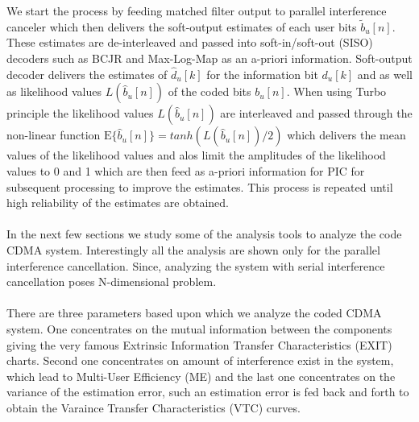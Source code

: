 We start the process by feeding matched filter output to parallel interference canceler which then delivers the soft-output estimates of each user bits $\tilde{b}_u[n]$. These estimates are de-interleaved and passed into soft-in/soft-out (SISO) decoders such as BCJR \cite{BCJR} and Max-Log-Map \cite{MLP} as an a-priori information. Soft-output decoder delivers the estimates of $\hat{d}_u[k]$ for the information bit $d_u[k]$ and as well as likelihood values $L(\hat{b}_u[n])$ of the coded bits $b_u[n]$. When using Turbo principle the likelihood values $L(\hat{b}_u[n])$ are interleaved and passed through the non-linear function $\mathrm{E}\{\hat{b}_u[n]\}=tanh(L(\hat{b}_u[n])/2)$ which delivers the mean values of the likelihood values and alos limit the amplitudes of the likelihood values to 0 and 1 which are then feed as a-priori information for PIC for subsequent processing to improve the estimates. This process is repeated until high reliability of the estimates are obtained.\\ \\
In the next few sections we study some of the analysis tools to analyze the code CDMA system. Interestingly all the analysis are shown only for the parallel interference cancellation. Since, analyzing the system with serial interference cancellation poses N-dimensional problem. \\ \\
There are three parameters based upon which we analyze the coded CDMA system. One concentrates on the mutual information between the components giving the very famous Extrinsic Information Transfer Characteristics (EXIT) charts. Second one concentrates on amount of interference exist in the system, which lead to Multi-User Efficiency (ME) and the last one concentrates on the variance of the estimation error, such an estimation error is fed back and forth to obtain the Varaince Transfer Characteristics (VTC) curves. 
